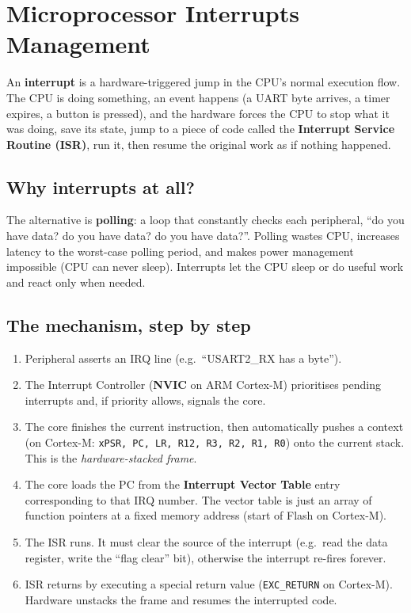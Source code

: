 \documentclass[11pt,a4paper]{article}
\begin{document}
\section{Microprocessor Interrupts Management}

An \textbf{interrupt} is a hardware-triggered jump in the CPU's normal
execution flow. The CPU is doing something, an event happens (a UART byte
arrives, a timer expires, a button is pressed), and the hardware forces the
CPU to stop what it was doing, save its state, jump to a piece of code called
the \textbf{Interrupt Service Routine (ISR)}, run it, then resume the original
work as if nothing happened.

\subsection{Why interrupts at all?}

The alternative is \textbf{polling}: a loop that constantly checks each
peripheral, ``do you have data? do you have data? do you have data?''.
Polling wastes CPU, increases latency to the worst-case polling period, and
makes power management impossible (CPU can never sleep). Interrupts let the
CPU sleep or do useful work and react only when needed.

\subsection{The mechanism, step by step}

\begin{enumerate}[leftmargin=*]
    \item Peripheral asserts an IRQ line (e.g.\ ``USART2\_RX has a byte'').
    \item The Interrupt Controller (\textbf{NVIC} on ARM Cortex-M) prioritises
    pending interrupts and, if priority allows, signals the core.
    \item The core finishes the current instruction, then automatically pushes
    a context (on Cortex-M: \texttt{xPSR, PC, LR, R12, R3, R2, R1, R0}) onto
    the current stack. This is the \emph{hardware-stacked frame}.
    \item The core loads the PC from the \textbf{Interrupt Vector Table}
    entry corresponding to that IRQ number. The vector table is just an array
    of function pointers at a fixed memory address (start of Flash on Cortex-M).
    \item The ISR runs. It must clear the source of the interrupt (e.g.\
    read the data register, write the ``flag clear'' bit), otherwise the
    interrupt re-fires forever.
    \item ISR returns by executing a special return value (\texttt{EXC\_RETURN}
    on Cortex-M). Hardware unstacks the frame and resumes the interrupted code.
\end{enumerate}
\end{document}
